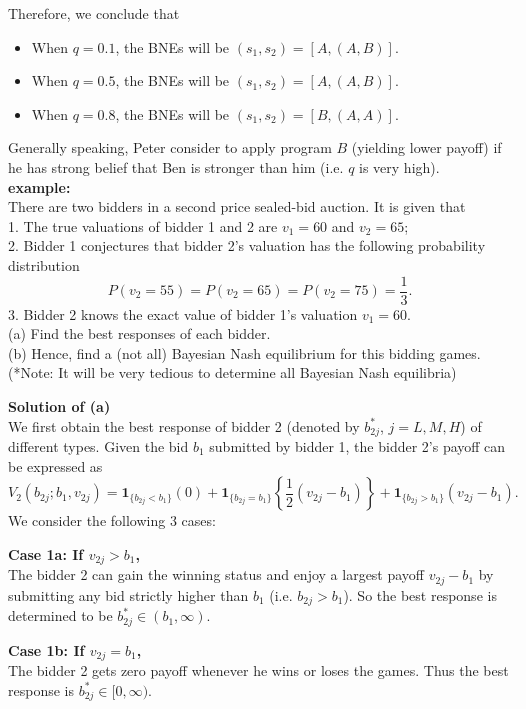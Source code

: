 \documentclass[twoside]{article}
\theoremstyle{definitionstyle}
\begin{document}
\noindent Therefore, we conclude that
\begin{itemize}
    \item When $q = 0.1$, the BNEs will be $(s_1, s_2) = [A, (A, B)]$.
    \item When $q = 0.5$, the BNEs will be $(s_1, s_2) = [A, (A, B)]$.
    \item When $q = 0.8$, the BNEs will be $(s_1, s_2) = [B, (A, A)]$.
\end{itemize}
Generally speaking, Peter consider to apply program $B$ (yielding lower payoff) if he has strong belief that Ben is stronger than him (i.e. $q$ is very high).\\
\newline
%
%
%
%
%
\textbf{example:}\\
There are two bidders in a second price sealed-bid auction. It is given that \\
1. The true valuations of bidder 1 and 2 are $v_1 = 60$ and $v_2 = 65$; \\
2. Bidder 1 conjectures that bidder 2’s valuation has the following probability distribution 
    \[
    P(v_2 = 55) = P(v_2 = 65) = P(v_2 = 75) = \frac{1}{3}.
    \]
3. Bidder 2 knows the exact value of bidder 1’s valuation $v_1 = 60$. \\
(a) Find the best responses of each bidder. \\
(b) Hence, find a (not all) Bayesian Nash equilibrium for this bidding games. (*Note: It will be very tedious to determine all Bayesian Nash equilibria)

\textbf{Solution of (a)} \\
We first obtain the best response of bidder 2 (denoted by $b_{2j}^*$, $j = L, M, H$) of different types. Given the bid $b_1$ submitted by bidder 1, the bidder 2’s payoff can be expressed as 
\[
V_2(b_{2j}; b_1, v_{2j}) = \mathbf{1}_{\{b_{2j} < b_1\}}(0) + \mathbf{1}_{\{b_{2j} = b_1\}}\left\{\frac{1}{2}(v_{2j} - b_1)\right\} + \mathbf{1}_{\{b_{2j} > b_1\}}(v_{2j} - b_1).
\]
We consider the following 3 cases:

\vspace{0.5em}
\noindent \textbf{Case 1a: If $v_{2j} > b_1$,} \\
The bidder 2 can gain the winning status and enjoy a largest payoff $v_{2j} - b_1$ by submitting any bid strictly higher than $b_1$ (i.e. $b_{2j} > b_1$). So the best response is determined to be $b_{2j}^* \in (b_1, \infty)$.

\vspace{0.5em}
\noindent \textbf{Case 1b: If $v_{2j} = b_1$,} \\
The bidder 2 gets zero payoff whenever he wins or loses the games. Thus the best response is $b_{2j}^* \in [0, \infty)$.
\end{document}
